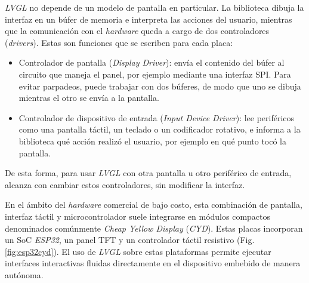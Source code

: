 \emph{LVGL} no depende de un modelo de pantalla en particular. La biblioteca dibuja la interfaz en un búfer de memoria e interpreta las acciones del usuario, mientras que la comunicación con el \emph{hardware} queda a cargo de dos controladores (\emph{drivers}). Estas son funciones que se escriben para cada placa:

\begin{itemize}
    \item Controlador de pantalla (\emph{Display Driver}): envía el contenido del búfer al circuito que maneja el panel, por ejemplo mediante una interfaz SPI. Para evitar parpadeos, puede trabajar con dos búferes, de modo que uno se dibuja mientras el otro se envía a la pantalla.
    \item Controlador de dispositivo de entrada (\emph{Input Device Driver}): lee periféricos como una pantalla táctil, un teclado o un codificador rotativo, e informa a la biblioteca qué acción realizó el usuario, por ejemplo en qué punto tocó la pantalla.
\end{itemize}

De esta forma, para usar \emph{LVGL} con otra pantalla u otro periférico de entrada, alcanza con cambiar estos controladores, sin modificar la interfaz.


En el ámbito del \emph{hardware} comercial de bajo costo, esta combinación de pantalla, interfaz táctil y microcontrolador suele integrarse en módulos compactos denominados comúnmente \emph{Cheap Yellow Display} (\emph{CYD}). Estas placas incorporan un SoC \emph{ESP32}, un panel TFT y un controlador táctil resistivo (Fig. \ref{fig:esp32cyd}). El uso de \emph{LVGL} sobre estas plataformas permite ejecutar interfaces interactivas fluidas directamente en el dispositivo embebido de manera autónoma.

